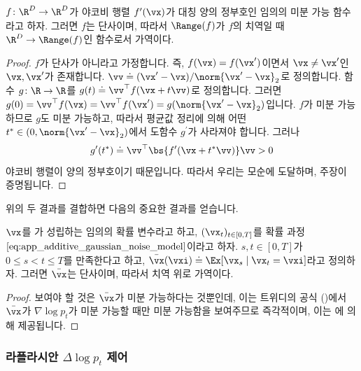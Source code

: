 \documentclass[../../book-main_ko.tex]{subfiles}
\begin{document}
\begin{lemma}\label{lem:gribonval_A2}
    \(f \colon \R^{D} \to \R^{D}\)가 야코비 행렬 \(f^{\prime}(\vx)\)가 대칭 양의 정부호인 임의의 미분 가능 함수라고 하자. 그러면 \(f\)는 단사이며, 따라서 \(\Range(f)\)가 \(f\)의 치역일 때 \(\R^{D} \to \Range(f)\)인 함수로서 가역이다.
\end{lemma}
\begin{proof}
    \(f\)가 단사가 아니라고 가정합니다. 즉, \(f(\vx) = f(\vx^{\prime})\)이면서 \(\vx \neq \vx^{\prime}\)인 \(\vx, \vx^{\prime}\)가 존재합니다. \(\vv \doteq (\vx^{\prime} - \vx)/\norm{\vx^{\prime} - \vx}_{2}\)로 정의합니다. 함수 \(g \colon \R \to \R\)를 \(g(t) \doteq \vv^{\top}f(\vx + t\vv)\)로 정의합니다. 그러면 \(g(0) = \vv^{\top}f(\vx) = \vv^{\top}f(\vx^{\prime}) = g(\norm{\vx^{\prime} - \vx}_{2})\)입니다. \(f\)가 미분 가능하므로 \(g\)도 미분 가능하고, 따라서 평균값 정리에 의해 어떤 \(t^{\ast} \in (0, \norm{\vx^{\prime} - \vx}_{2})\)에서 도함수 \(g^{\prime}\)가 사라져야 합니다. 그러나
    \begin{equation}
        g^{\prime}(t^{\ast}) \doteq \vv^{\top}\bs{f^{\prime}(\vx + t^{\ast}\vv)}\vv > 0
    \end{equation}
    야코비 행렬이 양의 정부호이기 때문입니다. 따라서 우리는 모순에 도달하며, 주장이 증명됩니다.
\end{proof}

위의 두 결과를 결합하면 다음의 중요한 결과를 얻습니다.

\begin{corollary}\label{cor:gribonval_A2}
    \(\vx\)를 가 성립하는 임의의 확률 변수라고 하고, \((\vx_{t})_{t \in [0, T]}\)를 확률 과정 \(\eqref{eq:app_additive_gaussian_noise_model}\)이라고 하자. \(s, t \in [0, T]\)가 \(0 \leq s < t \leq T\)를 만족한다고 하고, \(\bar{\vx}(\vxi) \doteq \Ex[\vx_{s} \mid \vx_{t} = \vxi]\)라고 정의하자. 그러면 \(\bar{\vx}\)는 단사이며, 따라서 치역 위로 가역이다.
\end{corollary}
\begin{proof}
    보여야 할 것은 \(\bar{\vx}\)가 미분 가능하다는 것뿐인데, 이는 트위디의 공식 ()에서 \(\bar{\vx}\)가 \(\nabla \log p_{t}\)가 미분 가능할 때만 미분 가능함을 보여주므로 즉각적이며, 이는 에 의해 제공됩니다.
\end{proof}

\subsubsection{라플라시안 \(\Delta \log p_{t}\) 제어}
\end{document}
